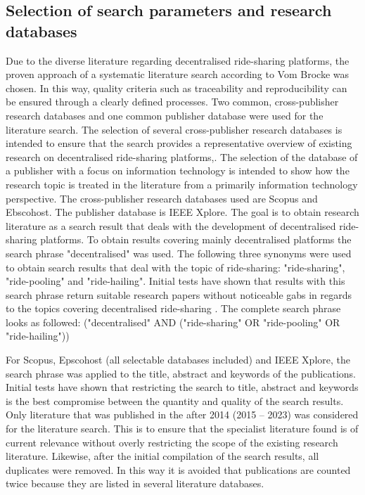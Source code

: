 \subsection{Selection of search parameters and research databases}
Due to the diverse literature regarding decentralised ride-sharing platforms, the proven approach of a systematic literature search according to Vom Brocke was chosen. In this way, quality criteria such as traceability and reproducibility can be ensured through a clearly defined processes. Two common, cross-publisher research databases and one common publisher database were used for the literature search.
The selection of several cross-publisher research databases is intended to ensure that the search provides a representative overview of existing research on decentralised ride-sharing platforms,. The selection of the database of a publisher with a focus on information technology is intended to show how the research topic is treated in the literature from a primarily information technology perspective. The cross-publisher research databases used are Scopus and Ebscohost. The publisher database is IEEE Xplore.
The goal is to obtain research literature as a search result that deals with the development of decentralised ride-sharing platforms. To obtain results covering mainly decentralised platforms the search phrase "decentralised" was used. The following three synonyms were used to obtain search results that deal with the topic of ride-sharing: "ride-sharing", "ride-pooling" and "ride-hailing". Initial tests have shown that results with this search phrase return suitable research papers without noticeable gabs in regards to the topics covering decentralised ride-sharing .
The complete search phrase looks as followed:
("decentralised" AND ("ride-sharing" OR "ride-pooling" OR "ride-hailing"))

For Scopus, Epscohost (all selectable databases included) and IEEE Xplore, the search phrase was applied to the title, abstract and keywords of the publications. Initial tests have shown that restricting the search to title, abstract and keywords is the best compromise between the quantity and quality of the search results. Only literature that was published in the after 2014 (2015 – 2023) was considered for the literature search. This is to ensure that the specialist literature found is of current relevance without overly restricting the scope of the existing research literature. Likewise, after the initial compilation of the search results, all duplicates were removed. In this way it is avoided that publications are counted twice because they are listed in several literature databases.

